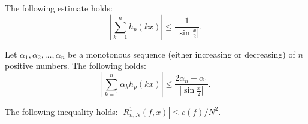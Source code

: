\begin{lemma} \label{hx_sum_estimate}
	The following estimate holds:
	\begin{equation*}
	\left|\sum_{k=1}^{n}h_{p}(kx)\right|\leq\frac{1}{\left|\sin\frac{x}{2}\right|}.
	\end{equation*}
\end{lemma}

\begin{lemma}\label{akhkx_estimate}
	Let $\alpha_1,\alpha_2, \ldots, \alpha_n$ be a monotonous sequence (either increasing or decreasing) of $n$ positive numbers. The following holds:
	$$
	\left|\sum_{k=1}^{n} \alpha_{k} h_p(kx)\right| \leq \frac{2\alpha_n + \alpha_1}{\left|\sin \frac{x}{2}\right|}.
	$$
\end{lemma}


\begin{lemma}
	The following inequality holds:
	$
	\left|R_{n,N}^{1}(f,x)\right|\leq{c(f)}/{N^{2}}.
	$
\end{lemma}



